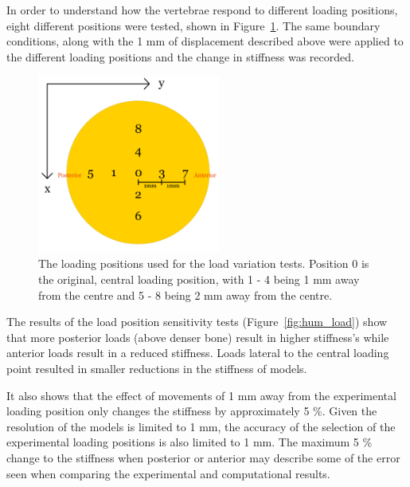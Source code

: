 In order to understand how the vertebrae respond to different loading positions, eight different positions were tested, shown in Figure~\ref{fig:loading_pos}. The same boundary conditions, along with the 1 mm of displacement described above were applied to the different loading positions and the change in stiffness was recorded.

\begin{figure}[ht!]
\centering
\includegraphics[width=6cm]{Chapters/Chapter_HT_images/Loading_positions.png}
\caption{The loading positions used for the load variation tests. Position 0 is the original, central loading position, with 1 - 4 being 1 mm away from the centre and 5 - 8 being 2 mm away from the centre.}
\label{fig:loading_pos}
\end{figure}


The results of the load position sensitivity tests (Figure~\ref{fig:hum_load}) show that more posterior loads (above denser bone) result in higher stiffness's while anterior loads result in a reduced stiffness. Loads lateral to the central loading point resulted in smaller reductions in the stiffness of models.

It also shows that the effect of movements of 1 mm away from the experimental loading position only changes the stiffness by approximately 5 \%.
Given the resolution of the models is limited to 1 mm, the accuracy of the selection of the experimental loading positions is also limited to 1 mm.
The maximum 5 \% change to the stiffness when posterior or anterior may describe some of the error seen when comparing the experimental and computational results.

